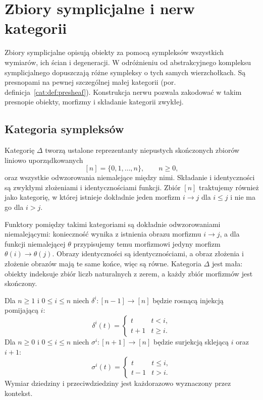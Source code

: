 \section{Zbiory symplicjalne i nerw kategorii}\label{cat:sec:simplicial-sets}

Zbiory symplicjalne opisują obiekty za pomocą sympleksów wszystkich wymiarów, ich ścian i degeneracji. W odróżnieniu od abstrakcyjnego kompleksu symplicjalnego dopuszczają różne sympleksy o tych samych wierzchołkach. Są presnopami na pewnej szczególnej małej kategorii (por. definicja~\ref{cat:def:presheaf}). Konstrukcja nerwu pozwala zakodować w takim presnopie obiekty, morfizmy i składanie kategorii zwykłej.

\subsection{Kategoria sympleksów}

\begin{definicja}\label{cat:def:simplex-category}
Kategorię $\Delta$ tworzą ustalone reprezentanty niepustych skończonych zbiorów liniowo uporządkowanych
\[
 [n]=\{0,1,\ldots,n\},\qquad n\geq 0,
\]
oraz wszystkie odwzorowania niemalejące między nimi. Składanie i identyczności są zwykłymi złożeniami i identycznościami funkcji. Zbiór $[n]$ traktujemy również jako kategorię, w której istnieje dokładnie jeden morfizm $i\to j$ dla $i\leq j$ i nie ma go dla $i>j$.
\end{definicja}
Funktory pomiędzy takimi kategoriami są dokładnie odwzorowaniami niemalejącymi: konieczność wynika z istnienia obrazu morfizmu $i\to j$, a dla funkcji niemalejącej $\theta$ przypisujemy temu morfizmowi jedyny morfizm $\theta(i)\to\theta(j)$. Obrazy identyczności są identycznościami, a obraz złożenia i złożenie obrazów mają te same końce, więc są równe. Kategoria $\Delta$ jest mała: obiekty indeksuje zbiór liczb naturalnych z zerem, a każdy zbiór morfizmów jest skończony.

\begin{definicja}\label{cat:def:delta-generators}
Dla $n\geq1$ i $0\leq i\leq n$ niech $\delta^i:[n-1]\to[n]$ będzie rosnącą injekcją pomijającą $i$:
\[
 \delta^i(t)=
 \begin{cases}t&t<i,\\t+1&t\geq i.\end{cases}
\]
Dla $n\geq0$ i $0\leq i\leq n$ niech $\sigma^i:[n+1]\to[n]$ będzie surjekcją sklejącą $i$ oraz $i+1$:
\[
 \sigma^i(t)=
 \begin{cases}t&t\leq i,\\t-1&t>i.\end{cases}
\]
Wymiar dziedziny i przeciwdziedziny jest każdorazowo wyznaczony przez kontekst.
\end{definicja}

